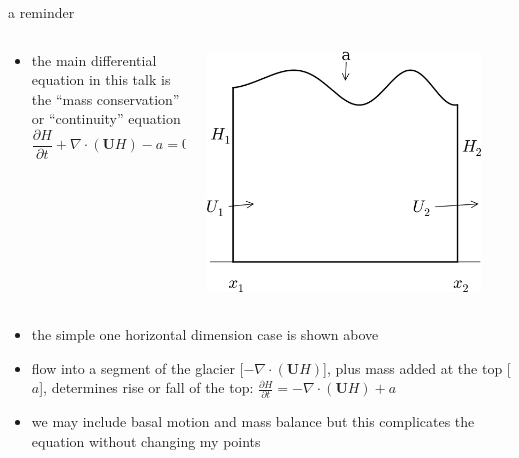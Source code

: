 \documentclass[10pt,hyperref,dvipsnames]{beamer}
\newcommand{\bU}{\mathbf{U}}
\newcommand{\Div}{\nabla\cdot}
\begin{document}
\begin{frame}{a reminder}

\begin{columns}
\begin{column}{0.5\textwidth}
\begin{itemize}
\item the main differential equation in this talk is the ``mass conservation'' or ``continuity'' equation
   $$\frac{\partial H}{\partial t} + \Div \left(\bU H\right) - a = 0$$
\end{itemize}
\end{column}
\begin{column}{0.5\textwidth}
\hfill \includegraphics[width=0.9\textwidth]{figs/slabmasscontfig.png}
\end{column}
\end{columns}

\bigskip
\begin{itemize}
\item the simple one horizontal dimension case is shown above
\item flow into a segment of the glacier [$-\Div \left(\bU H\right)$], plus mass added at the top [$a$], determines rise or fall of the top: \quad $\frac{\partial H}{\partial t} = - \Div \left(\bU H\right) + a$

\item we may include basal motion and mass balance but this complicates the equation without changing my points
\end{itemize}
\end{frame}
\end{document}
